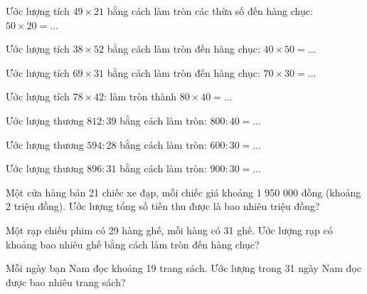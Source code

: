 \begin{ex}
Ước lượng tích $49 \times 21$ bằng cách làm tròn các thừa số đến hàng chục: $50 \times 20 = \dots$
\end{ex}

\begin{ex}
Ước lượng tích $38 \times 52$ bằng cách làm tròn đến hàng chục: $40 \times 50 = \dots$
\end{ex}

\begin{ex}
Ước lượng tích $69 \times 31$ bằng cách làm tròn đến hàng chục: $70 \times 30 = \dots$
\end{ex}

\begin{ex}
Ước lượng tích $78 \times 42$: làm tròn thành $80 \times 40 = \dots$
\end{ex}

\begin{ex}
Ước lượng thương $812 : 39$ bằng cách làm tròn: $800 : 40 = \dots$
\end{ex}

\begin{ex}
Ước lượng thương $594 : 28$ bằng cách làm tròn: $600 : 30 = \dots$
\end{ex}

\begin{ex}
Ước lượng thương $896 : 31$ bằng cách làm tròn: $900 : 30 = \dots$
\end{ex}

\begin{ex}
Một cửa hàng bán 21 chiếc xe đạp, mỗi chiếc giá khoảng 1 950 000 đồng (khoảng 2 triệu đồng). Ước lượng tổng số tiền thu được là bao nhiêu triệu đồng?
\end{ex}

\begin{ex}
Một rạp chiếu phim có 29 hàng ghế, mỗi hàng có 31 ghế. Ước lượng rạp có khoảng bao nhiêu ghế bằng cách làm tròn đến hàng chục?
\end{ex}

\begin{ex}
Mỗi ngày bạn Nam đọc khoảng 19 trang sách. Ước lượng trong 31 ngày Nam đọc được bao nhiêu trang sách?
\end{ex}

